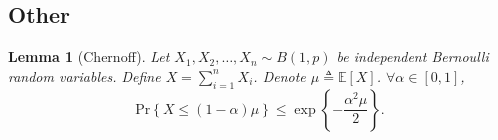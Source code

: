 \documentclass[10pt]{article}
\def\pr{{\text{Pr}}}
\newtheorem{lem}{Lemma}
\def\sE{{\mathbb{E}}}
\begin{document}
\subsection{Other}

\begin{lem}[Chernoff]
    Let $X_1, X_2, \dots, X_n \sim B(1, p)$ be independent Bernoulli random variables. Define $X = \sum\limits_{i=1}^{n}{ X_i  }$. Denote $\mu \triangleq \sE\left[ X \right]$. $\forall \alpha \in [0,1]$,
\begin{equation*}
    \pr\left\{ X \le (1 - \alpha) \mu \right\} \le \exp\left\{ - \frac{\alpha^2 \mu}{2} \right\}.
\end{equation*}
\end{lem}

\begin{equation*}
\begin{split}
\end{split}
\end{equation*}
\end{document}
